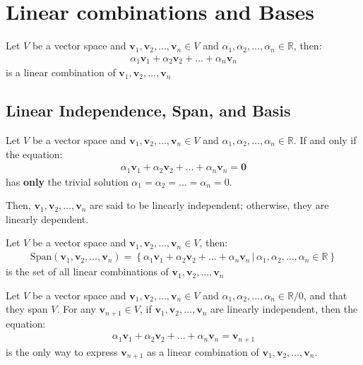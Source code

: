 \documentclass[11pt]{article}
\begin{document}
\section{Linear combinations and Bases}
\begin{definition}
    Let $V$ be a vector space and $\textbf{v}_1, \textbf{v}_2, \ldots, \textbf{v}_n \in V$ and $\alpha_1, \alpha_2, \ldots, \alpha_n \in \mathbb{R}$, then:
    \begin{align*}
        \alpha_1 \textbf{v}_1 + \alpha_2 \textbf{v}_2 + \ldots + \alpha_n \textbf{v}_n
    \end{align*}
    is a linear combination of $\textbf{v}_1, \textbf{v}_2, \ldots, \textbf{v}_n$
\end{definition}
\subsection{Linear Independence, Span, and Basis}
\begin{definition}
    Let $V$ be a vector space and $\textbf{v}_1, \textbf{v}_2, \ldots, \textbf{v}_n \in V$ and $\alpha_1, \alpha_2, \ldots, \alpha_n \in \mathbb{R}$. If and only if the equation:
    \begin{align*}
        \alpha_1 \textbf{v}_1 + \alpha_2 \textbf{v}_2 + \ldots + \alpha_n \textbf{v}_n = \textbf{0}
    \end{align*}
    has \textbf{only} the trivial solution $\alpha_1 = \alpha_2 = \ldots = \alpha_n = 0$.

    Then, $\textbf{v}_1, \textbf{v}_2, \ldots, \textbf{v}_n$ are said to be linearly independent; otherwise, they are linearly dependent.
\end{definition}
\begin{definition}[Span]
    Let $V$ be a vector space and $\textbf{v}_1, \textbf{v}_2, \ldots, \textbf{v}_n \in V$, then:
    \begin{align}
        \text{Span}(\textbf{v}_1, \textbf{v}_2, \ldots, \textbf{v}_n) = \left\{ \alpha_1 \textbf{v}_1 + \alpha_2 \textbf{v}_2 + \ldots + \alpha_n \textbf{v}_n \, | \, \alpha_1, \alpha_2, \ldots, \alpha_n \in \mathbb{R} \right\}
    \end{align}
    is the set of all linear combinations of $\textbf{v}_1, \textbf{v}_2, \ldots, \textbf{v}_n$
\end{definition}
\begin{theorem}
    Let $V$ be a vector space and $\textbf{v}_1, \textbf{v}_2, \ldots, \textbf{v}_n \in V$ and $\alpha_1, \alpha_2, \ldots, \alpha_n \in \mathbb{R}/0$, and that they span $V$. For any $\textbf{v}_{n+1} \in V$, if $\textbf{v}_1, \textbf{v}_2, \ldots, \textbf{v}_n$ are linearly independent, then the equation:
    \begin{align*}
        \alpha_1 \textbf{v}_1 + \alpha_2 \textbf{v}_2 + \ldots + \alpha_n \textbf{v}_n = \textbf{v}_{n+1}  
    \end{align*} 
    is the only way to express $\textbf{v}_{n+1}$ as a linear combination of $\textbf{v}_1, \textbf{v}_2, \ldots, \textbf{v}_n$.
\end{theorem}
\end{document}
